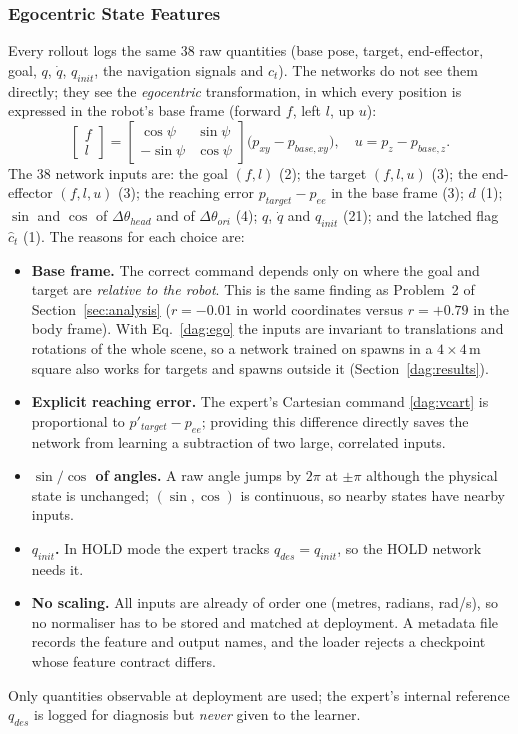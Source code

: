 \documentclass[conference]{IEEEtran}
\begin{document}
\subsubsection{Egocentric State Features}
\label{dag:state}

Every rollout logs the same 38 raw quantities (base pose, target, end-effector, goal, $q$, $\dot q$, $q_{init}$, the navigation signals and $c_t$). The networks do not see them directly; they see the \emph{egocentric} transformation, in which every position is expressed in the robot's base frame (forward $f$, left $l$, up $u$):
\begin{equation}
  \begin{bmatrix} f\\ l\end{bmatrix}=\begin{bmatrix}\cos\psi&\sin\psi\\-\sin\psi&\cos\psi\end{bmatrix}\bigl(p_{xy}-p_{base,xy}\bigr),\quad u=p_z-p_{base,z}.
  \label{dag:ego}
\end{equation}
The 38 network inputs are: the goal $(f,l)$ (2); the target $(f,l,u)$ (3); the end-effector $(f,l,u)$ (3); the reaching error $p_{target}-p_{ee}$ in the base frame (3); $d$ (1); $\sin$ and $\cos$ of $\Delta\theta_{head}$ and of $\Delta\theta_{ori}$ (4); $q$, $\dot q$ and $q_{init}$ (21); and the latched flag $\hat c_t$ (1). The reasons for each choice are:
\begin{itemize}
  \item \textbf{Base frame.} The correct command depends only on where the goal and target are \emph{relative to the robot}. This is the same finding as Problem~2 of Section~\ref{sec:analysis} ($r=-0.01$ in world coordinates versus $r=+0.79$ in the body frame). With Eq.~\eqref{dag:ego} the inputs are invariant to translations and rotations of the whole scene, so a network trained on spawns in a $4\times4$\,m square also works for targets and spawns outside it (Section~\ref{dag:results}).
  \item \textbf{Explicit reaching error.} The expert's Cartesian command \eqref{dag:vcart} is proportional to $p'_{target}-p_{ee}$; providing this difference directly saves the network from learning a subtraction of two large, correlated inputs.
  \item \textbf{$\sin/\cos$ of angles.} A raw angle jumps by $2\pi$ at $\pm\pi$ although the physical state is unchanged; $(\sin,\cos)$ is continuous, so nearby states have nearby inputs.
  \item \textbf{$q_{init}$.} In HOLD mode the expert tracks $q_{des}=q_{init}$, so the HOLD network needs it.
  \item \textbf{No scaling.} All inputs are already of order one (metres, radians, rad/s), so no normaliser has to be stored and matched at deployment. A metadata file records the feature and output names, and the loader rejects a checkpoint whose feature contract differs.
\end{itemize}
Only quantities observable at deployment are used; the expert's internal reference $q_{des}$ is logged for diagnosis but \emph{never} given to the learner.
\end{document}
